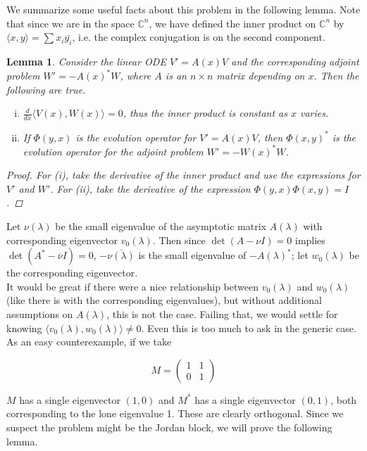 \documentclass[12pt]{article}
\def\C{{\mathbb C}}
\newtheorem{lemma}{Lemma}
\begin{document}
We summarize some useful facts about this problem in the following lemma. Note that since we are in the space $\C^n$, we have defined the inner product on $\C^n$ by $\langle x, y \rangle = \sum x_i \bar{y_i}$, i.e. the complex conjugation is on the second component.

\begin{lemma}\label{eigadjoint}
Consider the linear ODE $V' = A(x)V$ and the corresponding adjoint problem $W' = -A(x)^* W$, where $A$ is an $n \times n$ matrix depending on $x$. Then the following are true.
\begin{enumerate}[(i)]
\item $\frac{d}{dx}\langle V(x), W(x) \rangle = 0$, thus the inner product is constant as $x$ varies.
\item If $\Phi(y, x)$ is the evolution operator for $V' = A(x)V$, then $\Phi(x, y)^*$ is the evolution operator for the adjoint problem $W' = -W(x)^* W$.
\end{enumerate}
\begin{proof}
For (i), take the derivative of the inner product and use the expressions for $V'$ and $W'$. For (ii), take the derivative of the expression $\Phi(y, x)\Phi(x, y) = I$.
\end{proof}
\end{lemma}

Let $\nu(\lambda)$ be the small eigenvalue of the asymptotic matrix $A(\lambda)$ with corresponding eigenvector $v_0(\lambda)$. Then since $\det(A - \nu I) = 0$ implies $\det(A^* - \overline{\nu}I) = 0$, $-\overline{\nu(\lambda)}$ is the small eigenvalue of $-A(\lambda)^*$; let $w_0(\lambda)$ be the corresponding eigenvector.\\

It would be great if there were a nice relationship between $v_0(\lambda)$ and $w_0(\lambda)$ (like there is with the corresponding eigenvalues), but without additional assumptions on $A(\lambda)$, this is not the case. Failing that, we would settle for knowing $\langle v_0(\lambda), w_0(\lambda) \rangle \neq 0$. Even this is too much to ask in the generic case. As an easy counterexample, if we take

\[
M = \begin{pmatrix}1 & 1 \\ 0 & 1 \end{pmatrix}
\]

$M$ has a single eigenvector $(1, 0)$ and $M^*$ has a single eigenvector $(0, 1)$, both corresponding to the lone eigenvalue 1. These are clearly orthogonal. Since we suspect the problem might be the Jordan block, we will prove the following lemma.
\end{document}
